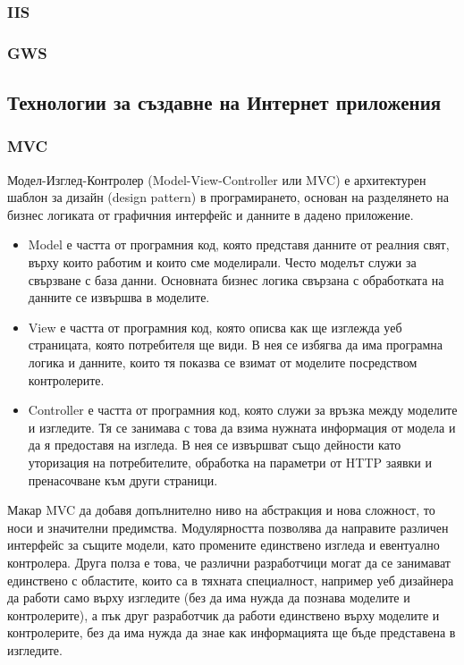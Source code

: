 \documentclass[pdftex,12pt,a4paper]{report}
\begin{document}
\subsubsection {IIS}
\subsubsection {GWS}
\subsection {Технологии за създавне на Интернет приложения}
\subsubsection {MVC}
Модел-Изглед-Контролер (Model-View-Controller или MVC) е архитектурен шаблон за дизайн (design pattern) в програмирането, основан на разделянето на бизнес логиката от графичния интерфейс и данните в дадено приложение.
\begin{itemize}
  \item Model е частта от програмния код, която представя данните от реалния свят, върху които работим и които сме моделирали. Често моделът служи за свързване с база данни. Основната бизнес логика свързана с обработката на данните се извършва в моделите.
  \item View е частта от програмния код, която описва как ще изглежда уеб страницата, която потребителя ще види. В нея се избягва да има програмна логика и данните, които тя показва се взимат от моделите посредством контролерите.
  \item Controller е частта от програмния код, която служи за връзка между моделите и изгледите. Тя се занимава с това да взима нужната информация от модела и да я предоставя на изгледа. В нея се извършват също дейности като уторизация на потребителите, обработка на параметри от HTTP заявки и пренасочване към други страници.
\end{itemize}
Макар MVC да добавя допълнително ниво на абстракция и нова сложност, то носи и значителни предимства. Модулярността позволява да направите различен интерфейс за същите модели, като промените единствено изгледа и евентуално контролера. Друга полза е това, че различни разработчици могат да се занимават единствено с областите, които са в тяхната специалност, например уеб дизайнера да работи само върху изгледите (без да има нужда да познава моделите и контролерите), а пък друг разработчик да работи единствено върху моделите и контролерите, без да има нужда да знае как информацията ще бъде представена в изгледите.
\end{document}
